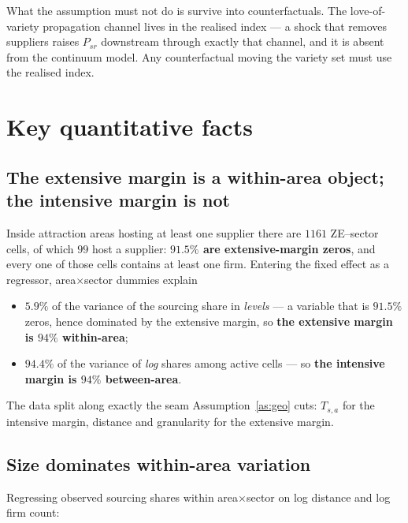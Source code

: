 \documentclass[11pt]{article}
\begin{document}
What the assumption must not do is survive into counterfactuals. The love-of-variety propagation
channel lives in the realised index --- a shock that removes suppliers raises $P_{sr}$ downstream
through exactly that channel, and it is absent from the continuum model. Any counterfactual moving
the variety set must use the realised index.

\section{Key quantitative facts}
\label{sec:facts}

\subsection{The extensive margin is a within-area object; the intensive margin is not}

Inside attraction areas hosting at least one supplier there are $1161$ ZE--sector cells, of which
$99$ host a supplier: \textbf{$91.5\%$ are extensive-margin zeros}, and every one of those cells
contains at least one firm. Entering the fixed effect as a regressor,
area$\times$sector dummies explain
\begin{itemize}[nosep,topsep=2pt]
\item $5.9\%$ of the variance of the sourcing share in \emph{levels} --- a variable that is
$91.5\%$ zeros, hence dominated by the extensive margin, so \textbf{the extensive margin is
$94\%$ within-area};
\item $94.4\%$ of the variance of \emph{log} shares among active cells --- so \textbf{the intensive
margin is $94\%$ between-area}.
\end{itemize}
The data split along exactly the seam Assumption~\ref{as:geo} cuts: $T_{s,a}$ for the intensive
margin, distance and granularity for the extensive margin.

\subsection{Size dominates within-area variation}

Regressing observed sourcing shares within area$\times$sector on log distance and log firm count:
\end{document}
